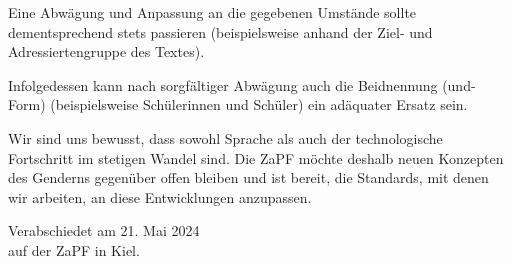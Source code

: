 \documentclass[DIV=calc]{scrartcl}
\let\oldgrqq=\grqq
\def\grqq{\oldgrqq\xspace}
\begin{document}
Eine Abwägung und Anpassung an die gegebenen Umstände sollte dementsprechend stets
passieren (beispielsweise anhand der Ziel- und Adressiertengruppe des Textes). 

Infolgedessen kann nach sorgfältiger Abwägung auch die Beidnennung (\glqq und-Form\grqq) (beispielsweise Schülerinnen und Schüler) ein adäquater Ersatz sein.

Wir sind uns bewusst, dass sowohl Sprache als auch der technologische Fortschritt im
stetigen Wandel sind.
Die ZaPF möchte deshalb neuen Konzepten des Genderns gegenüber offen bleiben und ist
bereit, die Standards, mit denen wir arbeiten, an diese Entwicklungen anzupassen.


%
\vfill
\begin{flushright}
	Verabschiedet am 21. Mai 2024 \\
	auf der ZaPF in Kiel.
\end{flushright}
\end{document}

